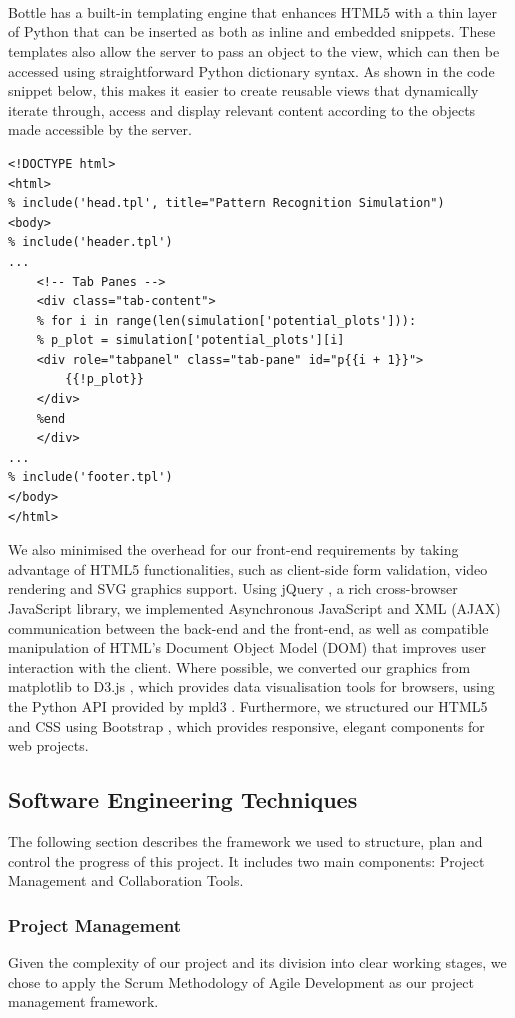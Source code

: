 \documentclass[a4paper,11pt]{article}
\begin{document}
\\
\\
\\ 
Bottle has a built-in templating engine that enhances HTML5 with a thin layer of Python that can be inserted as both as inline and embedded snippets. These templates also allow the server to pass an object to the view, which can then be accessed using straightforward Python dictionary syntax. As shown in the code snippet below, this makes it easier to create reusable views that dynamically iterate through, access and display relevant content according to the objects made accessible by the server.

\clearpage

\begin{verbatim}
<!DOCTYPE html>
<html>
% include('head.tpl', title="Pattern Recognition Simulation")
<body>
% include('header.tpl')
...
	<!-- Tab Panes -->
	<div class="tab-content">
	% for i in range(len(simulation['potential_plots'])):
	% p_plot = simulation['potential_plots'][i]
	<div role="tabpanel" class="tab-pane" id="p{{i + 1}}">
		{{!p_plot}}
	</div>
	%end
	</div>
...
% include('footer.tpl')
</body>
</html>
\end{verbatim}

We also minimised the overhead for our front-end requirements by taking advantage of HTML5 functionalities, such as client-side form validation, video rendering and SVG graphics support. Using jQuery \cite{jquery}, a rich cross-browser JavaScript library, we implemented Asynchronous JavaScript and XML (AJAX) communication between the back-end and the front-end, as well as compatible manipulation of HTML's Document Object Model (DOM) that improves user interaction with the client. Where possible, we converted our graphics from matplotlib to D3.js \cite{d3js}, which provides data visualisation tools for browsers, using the Python API provided by mpld3 \cite{mpld3}. Furthermore, we structured our HTML5 and CSS using Bootstrap \cite{bstrap}, which provides responsive, elegant components for web projects. 


\subsection{Software Engineering Techniques}
The following section describes the framework we used to structure, plan and control the progress of this project.
It includes two main components: Project Management and Collaboration Tools.
\subsubsection{Project Management}
Given the complexity of our project and its division into clear working stages, we chose to apply the Scrum Methodology of Agile Development as our project management framework.
\end{document}
